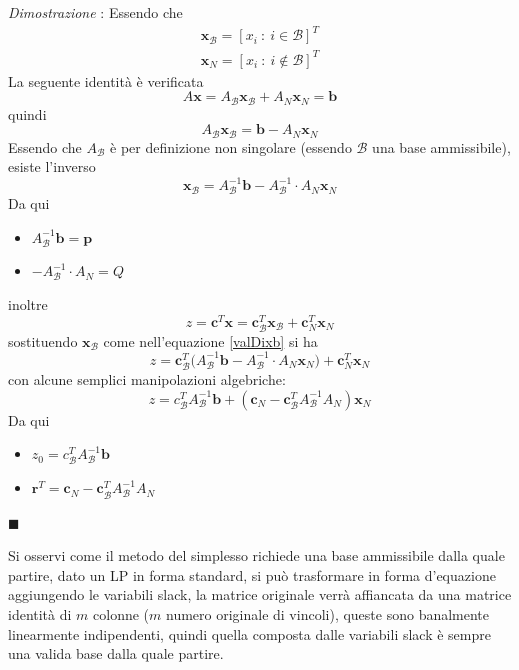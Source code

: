 \documentclass[10pt, letterpaper]{report}
\begin{document}
\textit{Dimostrazione} : Essendo che 
\begin{eqnarray*}
    \mathbf x_\mathcal{B}=[x_i \ : \ i\in \mathcal B]^T\\ 
    \mathbf x_N=[x_i \ : \ i\notin \mathcal B]^T
\end{eqnarray*}
La seguente identità è verificata 
$$ A\mathbf x = A_{\mathcal B}\mathbf x_{\mathcal B}+A_N\mathbf x_N=\mathbf b$$
quindi 
$$  A_{\mathcal B}\mathbf x_{\mathcal B}=\mathbf b-A_N\mathbf x_N$$
Essendo che $A_{\mathcal B}$ è per definizione non singolare (essendo $\mathcal B$ una base ammissibile), esiste l'inverso 
\begin{equation}\label{valDixb}
    \mathbf x_{\mathcal B}=A_{\mathcal B}^{-1}\mathbf b-A_{\mathcal B}^{-1}\cdot  A_N\mathbf x_N
\end{equation}
Da qui \begin{itemize}
    \item $A_{\mathcal B}^{-1}\mathbf b=\mathbf p$
    \item $-A_{\mathcal B}^{-1}\cdot A_N=Q$
\end{itemize}
inoltre $$ z=\mathbf c^T\mathbf x = \mathbf c_{\mathcal B}^T\mathbf x_{\mathcal B}+\mathbf c_{N}^T\mathbf x_{N}$$
sostituendo $\mathbf x_{\mathcal B}$ come nell'equazione \ref{valDixb} si ha 
$$ z=\mathbf c_{\mathcal B}^T\mathbf(A_{\mathcal B}^{-1}\mathbf b-A_{\mathcal B}^{-1}\cdot  A_N\mathbf x_N)+\mathbf c_{N}^T\mathbf x_{N}$$
con alcune semplici manipolazioni algebriche:
$$ z=c_{\mathcal B}^TA^{-1}_{\mathcal B}\mathbf b+(\mathbf c_N - \mathbf c_\mathcal{B}^TA_\mathcal{B}^{-1}A_N)\mathbf x_N$$
Da qui \begin{itemize}
    \item $z_0=c_{\mathcal B}^TA^{-1}_{\mathcal B}\mathbf b$
    \item $\mathbf r^T=\mathbf c_N - \mathbf c_\mathcal{B}^TA_\mathcal{B}^{-1}A_N$
\end{itemize}
\hfill$\blacksquare$\bigskip 

Si osservi come il  metodo del simplesso richiede una base ammissibile dalla quale partire, dato un LP in forma standard, si può trasformare in forma d'equazione aggiungendo le variabili slack, la matrice originale verrà affiancata da una matrice identità di $m$ colonne ($m$ numero originale di vincoli), queste sono banalmente linearmente indipendenti, quindi quella composta dalle variabili slack è sempre una valida base dalla quale partire.
\end{document}
